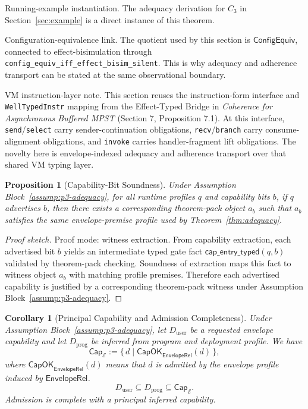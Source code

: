 \documentclass[a4paper,10pt,twocolumn,english]{article}
\numberwithin{equation}{section}
\theoremstyle{paperdef}
\theoremstyle{paperplain}
\newtheorem{proposition}[definition]{Proposition}
\newtheorem{corollary}[definition]{Corollary}
\theoremstyle{paperdef}
\theoremstyle{paperremark}
\theoremstyle{paperdef}
\newcommand{\EnvelopeRel}{\ensuremath{\mathsf{EnvelopeRel}}}
\newcommand{\ConfigEquiv}{\ensuremath{\mathsf{ConfigEquiv}}}
\begin{document}
Running-example instantiation. The adequacy derivation for $C_3$ in
Section~\ref{sec:example} is a direct instance of this theorem.

Configuration-equivalence link. The quotient used by this section is
\ConfigEquiv, connected to effect-bisimulation through
\nolinkurl{config_equiv_iff_effect_bisim_silent}. This is why adequacy and
adherence transport can be stated at the same observational boundary.

VM instruction-layer note. This section reuses the instruction-form interface and \texttt{WellTypedInstr} mapping from the Effect-Typed Bridge in \emph{Coherence for Asynchronous Buffered MPST} (Section 7, Proposition 7.1). At this interface, \texttt{send}/\texttt{select} carry sender-continuation obligations, \texttt{recv}/\texttt{branch} carry consume-alignment obligations, and \texttt{invoke} carries handler-fragment lift obligations. The novelty here is envelope-indexed adequacy and adherence transport over that shared VM typing layer.

\begin{proposition}[Capability-Bit Soundness]
	\label{prop:capability}
	Under Assumption Block~\ref{assump:p3-adequacy}, for all runtime profiles $q$ and capability bits $b$, if $q$ advertises $b$, then there exists a corresponding theorem-pack object $a_b$ such that $a_b$ satisfies the same envelope-premise profile used by Theorem~\ref{thm:adequacy}.
\end{proposition}

\begin{proof}[Proof sketch]
	Proof mode: witness extraction.
	From capability extraction, each advertised bit $b$ yields an intermediate
	typed gate fact
	$\mathsf{cap\_entry\_typed}(q,b)$ validated by theorem-pack checking.
	Soundness of extraction maps this fact to witness object $a_b$ with matching
	profile premises. Therefore each advertised capability is justified by a
	corresponding theorem-pack witness under Assumption
	Block~\ref{assump:p3-adequacy}.
\end{proof}

\begin{corollary}[Principal Capability and Admission Completeness]
	\label{cor:principal}
	Under Assumption Block~\ref{assump:p3-adequacy}, let $D_{\text{user}}$ be a requested envelope capability and let $D_{\text{prog}}$ be inferred from program and deployment profile. We have
	\[
		\mathsf{Cap}_{\mathcal{E}} := \{\, d \mid \mathsf{CapOK}_{\EnvelopeRel}(d)\,\},
	\]
	where $\mathsf{CapOK}_{\EnvelopeRel}(d)$ means that $d$ is admitted by the envelope profile induced by \EnvelopeRel.
	\begin{equation}
		D_{\text{user}} \subseteq D_{\text{prog}} \subseteq \mathsf{Cap}_{\mathcal{E}}.
	\end{equation}
	Admission is complete with a principal inferred capability.
\end{corollary}
\end{document}

